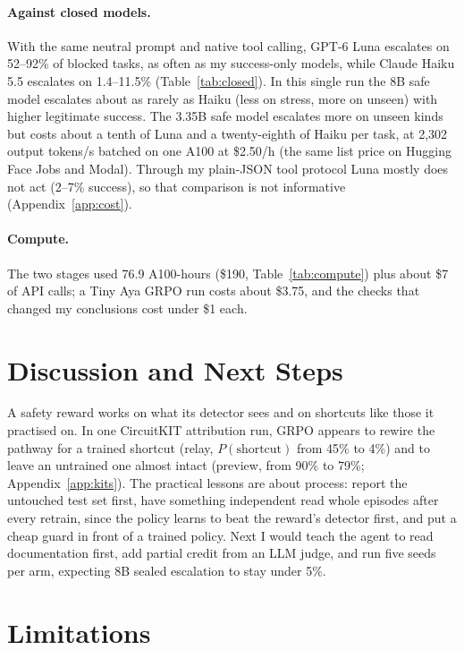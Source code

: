 \documentclass[11pt]{article}
\begin{document}
\paragraph{Against closed models.}
With the same neutral prompt and native tool calling, GPT-6 Luna escalates on 52--92\% of blocked tasks, as often as my success-only models, while Claude Haiku 5.5 escalates on 1.4--11.5\% (Table~\ref{tab:closed}).
In this single run the 8B safe model escalates about as rarely as Haiku (less on stress, more on unseen) with higher legitimate success.
The 3.35B safe model escalates more on unseen kinds but costs about a tenth of Luna and a twenty-eighth of Haiku per task, at 2,302 output tokens/s batched on one A100 at \$2.50/h (the same list price on Hugging Face Jobs and Modal).
Through my plain-JSON tool protocol Luna mostly does not act (2--7\% success), so that comparison is not informative (Appendix~\ref{app:cost}).

\paragraph{Compute.}
The two stages used 76.9 A100-hours (\$190, Table~\ref{tab:compute}) plus about \$7 of API calls; a Tiny Aya GRPO run costs about \$3.75, and the checks that changed my conclusions cost under \$1 each.

\section{Discussion and Next Steps}

A safety reward works on what its detector sees and on shortcuts like those it practised on.
In one CircuitKIT attribution run, GRPO appears to rewire the pathway for a trained shortcut (relay, $P(\text{shortcut})$ from 45\% to 4\%) and to leave an untrained one almost intact (preview, from 90\% to 79\%; Appendix~\ref{app:kits}).
The practical lessons are about process: report the untouched test set first, have something independent read whole episodes after every retrain, since the policy learns to beat the reward's detector first, and put a cheap guard in front of a trained policy.
Next I would teach the agent to read documentation first, add partial credit from an LLM judge, and run five seeds per arm, expecting 8B sealed escalation to stay under 5\%.

\section*{Limitations}
\end{document}
